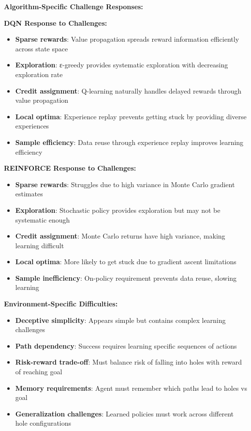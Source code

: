 \documentclass[12pt]{article}
\begin{document}
{{{\textbf{Algorithm-Specific Challenge Responses:}

\textbf{DQN Response to Challenges:}
\begin{itemize}
    \item \textbf{Sparse rewards}: Value propagation spreads reward information efficiently across state space
    \item \textbf{Exploration}: ε-greedy provides systematic exploration with decreasing exploration rate
    \item \textbf{Credit assignment}: Q-learning naturally handles delayed rewards through value propagation
    \item \textbf{Local optima}: Experience replay prevents getting stuck by providing diverse experiences
    \item \textbf{Sample efficiency}: Data reuse through experience replay improves learning efficiency
\end{itemize}

\textbf{REINFORCE Response to Challenges:}
\begin{itemize}
    \item \textbf{Sparse rewards}: Struggles due to high variance in Monte Carlo gradient estimates
    \item \textbf{Exploration}: Stochastic policy provides exploration but may not be systematic enough
    \item \textbf{Credit assignment}: Monte Carlo returns have high variance, making learning difficult
    \item \textbf{Local optima}: More likely to get stuck due to gradient ascent limitations
    \item \textbf{Sample inefficiency}: On-policy requirement prevents data reuse, slowing learning
\end{itemize}

\textbf{Environment-Specific Difficulties:}
\begin{itemize}
    \item \textbf{Deceptive simplicity}: Appears simple but contains complex learning challenges
    \item \textbf{Path dependency}: Success requires learning specific sequences of actions
    \item \textbf{Risk-reward trade-off}: Must balance risk of falling into holes with reward of reaching goal
    \item \textbf{Memory requirements}: Agent must remember which paths lead to holes vs goal
    \item \textbf{Generalization challenges}: Learned policies must work across different hole configurations
\end{itemize}

}}}
\end{document}
